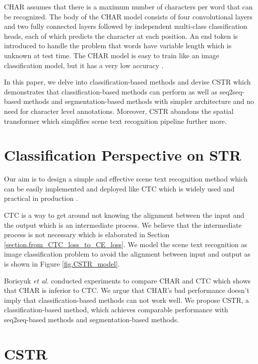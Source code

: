 \documentclass[final]{cvpr}
\begin{document}
CHAR \cite{jaderberg14c} assumes that there is a maximum number  of characters per word  that can be recognized.
The body of the CHAR model consists of four convolutional layers and two fully connected layers followed by  independent multi-class classification heads, each of which predicts the character at each position. An end token  is introduced to handle the problem that words have variable length which is unknown at test time.
The CHAR model is easy to train like an image classification model, but it has a very low accuracy \cite{borisyuk2018rosetta}.

In this paper, we delve into classification-based methods and devise CSTR which demonstrates that classification-based methods can perform as well as seq2seq-based methods and segmentation-based methods with simpler architecture and no need for character level annotations. Moreover, CSTR abandons the spatial transformer which simplifies scene text recognition pipeline further more.

\section{Classification Perspective on STR}

Our aim is to design a simple and effective scene text recognition method which can be easily implemented and deployed like CTC which is widely used and practical in production \cite{borisyuk2018rosetta, du2020pp}.

CTC is a way to get around not knowing the alignment between the input and the output which is an intermediate process. We believe that the intermediate process is not necessary which is elaborated in Section \ref{section.from_CTC_loss_to_CE_loss}. We model the scene text recognition as image classification problem to avoid the alignment between input and output as is shown in Figure \ref{fig.CSTR_model}.

Borisyuk \textit{et al.} \cite{borisyuk2018rosetta} conducted experiments to compare CHAR \cite{jaderberg14c} and CTC which shows that CHAR is inferior to CTC. We argue that CHAR's bad performance doesn't imply that classification-based methods can not work well. We propose CSTR, a classification-based method, which achieves comparable performance with seq2seq-based methods and segmentation-based methods.

\section{CSTR}
\end{document}
